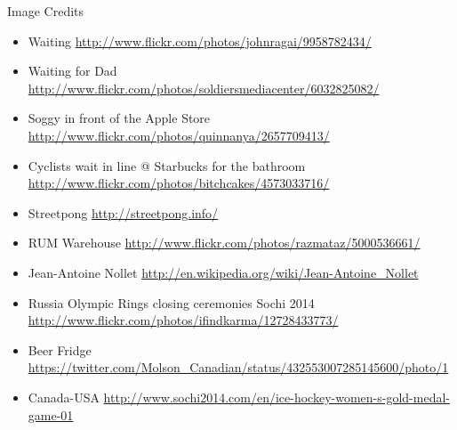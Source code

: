 \documentclass{beamer}
\begin{document}
\begin{frame}{Image Credits}
\begin{itemize}
  \item Waiting {\tiny \href{http://www.flickr.com/photos/johnragai/9958782434/}{http://www.flickr.com/photos/johnragai/9958782434/}}
  \item Waiting for Dad {\tiny \href{http://www.flickr.com/photos/soldiersmediacenter/6032825082/}{http://www.flickr.com/photos/soldiersmediacenter/6032825082/}}
  \item Soggy in front of the Apple Store {\tiny \href{http://www.flickr.com/photos/quinnanya/2657709413/}{http://www.flickr.com/photos/quinnanya/2657709413/}}
  \item Cyclists wait in line @ Starbucks for the bathroom {\tiny \href{http://www.flickr.com/photos/bitchcakes/4573033716/}{http://www.flickr.com/photos/bitchcakes/4573033716/}}
  \item Streetpong {\tiny \href{http://streetpong.info/}{http://streetpong.info/}}
  \item RUM Warehouse {\tiny \href{http://www.flickr.com/photos/razmataz/5000536661/}{http://www.flickr.com/photos/razmataz/5000536661/}}
  \item Jean-Antoine Nollet {\tiny \href{http://en.wikipedia.org/wiki/Jean-Antoine_Nollet}{http://en.wikipedia.org/wiki/Jean-Antoine\_Nollet}}
  \item Russia Olympic Rings closing ceremonies Sochi 2014 {\tiny \href{http://www.flickr.com/photos/ifindkarma/12728433773/}{http://www.flickr.com/photos/ifindkarma/12728433773/}}
  \item Beer Fridge {\tiny \href{https://twitter.com/Molson_Canadian/status/432553007285145600/photo/1}{https://twitter.com/Molson\_Canadian/status/432553007285145600/photo/1}}
  \item Canada-USA {\tiny \href{http://www.sochi2014.com/en/ice-hockey-women-s-gold-medal-game-01}{http://www.sochi2014.com/en/ice-hockey-women-s-gold-medal-game-01}}
\end{itemize}
\end{frame}
\end{document}
